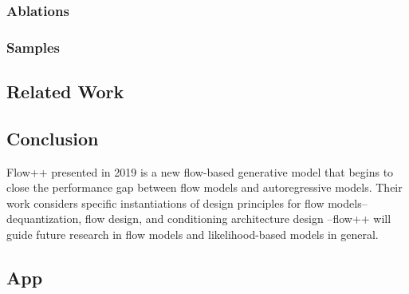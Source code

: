 \documentclass[]{IEEEtran}
\begin{document}
\subsubsection{Ablations }


\subsubsection{Samples}

\subsection{Related Work}

\subsection{Conclusion}
Flow++ presented in 2019 is a new ﬂow-based generative model that begins to close the performance gap between ﬂow models and autoregressive models. Their work considers speciﬁc instantiations of design principles for ﬂow models–dequantization, ﬂow design, and conditioning architecture design –flow++ will guide future research in ﬂow models and likelihood-based models in general.





\clearpage
\onecolumn
\begin{appendices}

\section{App} \label{sec:appendix-1}
 
\newpage

\end{appendices}
\end{document}

